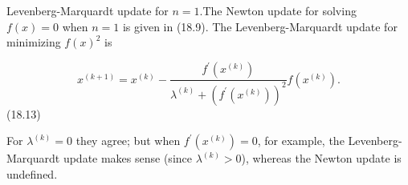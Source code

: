 Levenberg-Marquardt update for \(n=1\).The Newton update for solving \(f(x)=0\) when \(n=1\) is given in (18.9). The Levenberg-Marquardt update for minimizing \(f(x)^{2}\) is

\[x^{(k+1)}=x^{(k)}-\frac{f^{\prime}(x^{(k)})}{\lambda^{(k)}+(f^{\prime}(x^{(k) }))^{2}}f(x^{(k)}).\] (18.13)

For \(\lambda^{(k)}=0\) they agree; but when \(f^{\prime}(x^{(k)})=0\), for example, the Levenberg-Marquardt update makes sense (since \(\lambda^{(k)}>0\)), whereas the Newton update is undefined.

 